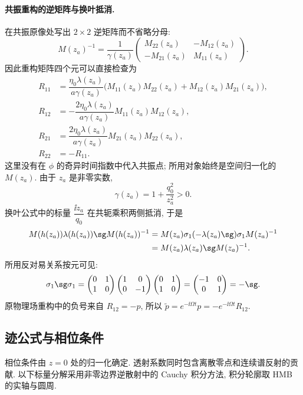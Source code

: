 \paragraph{共振重构的逆矩阵与换叶抵消.}
在共振原像处写出 $2\times2$ 逆矩阵而不省略分母:
\[
M(z_a)^{-1}
=\dfrac{1}{\gamma(z_a)}
\begin{pmatrix}
M_{22}(z_a)&-M_{12}(z_a)\\
-M_{21}(z_a)&M_{11}(z_a)
\end{pmatrix}.
\]
因此重构矩阵四个元可以直接检查为
\[
\begin{aligned}
R_{11}
&=\dfrac{\eta_0\lambda(z_a)}{a\gamma(z_a)}
\bigl(M_{11}(z_a)M_{22}(z_a)+M_{12}(z_a)M_{21}(z_a)\bigr),\\
R_{12}
&=-\dfrac{2\eta_0\lambda(z_a)}{a\gamma(z_a)}
M_{11}(z_a)M_{12}(z_a),\\
R_{21}
&=\dfrac{2\eta_0\lambda(z_a)}{a\gamma(z_a)}
M_{21}(z_a)M_{22}(z_a),\\
R_{22}&=-R_{11}.
\end{aligned}
\]
这里没有在 $\phi$ 的奇异时间指数中代入共振点;
所用对象始终是空间归一化的 $M(z_a)$.
由于 $z_a$ 是非零实数,
\[
\gamma(z_a)=1+\dfrac{q_0^2}{z_a^2}>0.
\]
换叶公式中的标量 $\dfrac{\ii z_a}{q_0}$ 在共轭乘积两侧抵消, 于是
\[
\begin{aligned}
M(h(z_a))\lambda(h(z_a))\sg M(h(z_a))^{-1}
&=M(z_a)\sigma_1(-\lambda(z_a)\sg)\sigma_1M(z_a)^{-1}\\
&=M(z_a)\lambda(z_a)\sg M(z_a)^{-1}.
\end{aligned}
\]
所用反对易关系按元可见:
\[
\sigma_1\sg\sigma_1
=\begin{pmatrix}0&1\\1&0\end{pmatrix}
\begin{pmatrix}1&0\\0&-1\end{pmatrix}
\begin{pmatrix}0&1\\1&0\end{pmatrix}
=\begin{pmatrix}-1&0\\0&1\end{pmatrix}=-\sg.
\]
原物理场重构中的负号来自 $R_{12}=-p$, 所以
$\widetilde p=e^{-\ii\Omega t}p=-e^{-\ii\Omega t}R_{12}$.

\subsection{迹公式与相位条件}
相位条件由 $z=0$ 处的归一化确定. 透射系数同时包含离散零点和连续谱反射的贡献. 以下标量分解采用非零边界逆散射中的 Cauchy 积分方法\cite{Fan2022,ZhangFan2020}, 积分轮廓取 HMB 的实轴与圆周.

